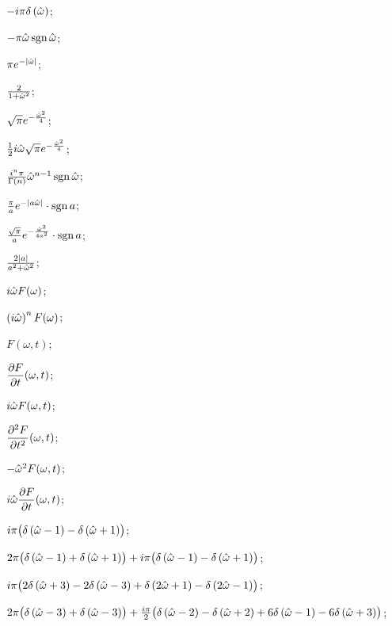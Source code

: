 	\begin{enumsols}

		\item \( - i \pi \delta\left( \hat{\omega} \right) \); \sfill %
		\item \( - \pi \hat{\omega} \operatorname{sgn}{\hat{\omega}} \); \sfill %
		\item \( \pi e^{-\left\vert \hat{\omega} \right\vert} \); \sfill %
		\item \( \frac{2}{1 + \hat{\omega}^2} \); \sfill %
		\item \( \sqrt{\pi} e^{-\frac{\hat{\omega}^2}{4}} \); \sfill %
		\item \( \frac{1}{2} i \hat{\omega} \sqrt{\pi} e^{-\frac{\hat{\omega}^2}{4}} \); \sfill %

		\item \( \frac{i^{n} \pi}{\Gamma(n)} \hat{\omega}^{n-1} \operatorname{sgn}{\hat{\omega}} \); \sfill %
		\item \( \frac{\pi}{a} e^{-\left\vert a\hat{\omega} \right\vert} \cdot \operatorname{sgn}{a} \); \sfill %
		\item \( \frac{\sqrt{\pi}}{a} e^{-\frac{\hat{\omega}^2}{4a^2}} \cdot \operatorname{sgn}{a} \); \sfill %
		\item \( \frac{2 \left\vert a \right\vert}{a^2 + \hat{\omega}^2} \); \sfill %
		\item \( i \hat{\omega} F(\omega) \); \sfill %
		\item \( \left( i \hat{\omega} \right)^{n} F(\omega) \); \sfill %

		\item \( F(\omega, t) \); \sfill %
		\item \( \dfrac{\partial F}{\partial t}(\omega, t) \); \sfill %
		\item \( i \hat{\omega} F(\omega, t) \); \sfill %
		\item \( \dfrac{\partial^{2} F}{\partial t^{2}}(\omega, t) \); \sfill %
		\item \( -\hat{\omega}^2 F(\omega, t) \); \sfill %
		\item \( i \hat{\omega} \dfrac{\partial F}{\partial t}(\omega, t) \); \sfill %

		\item \( i \pi \bigl(  \delta\left( \hat{\omega} - 1 \right) - \delta\left( \hat{\omega}+1 \right)  \bigr) \); \sfill %
		\item \( 2\pi \bigl(  \delta\left( \hat{\omega} - 1 \right) + \delta\left( \hat{\omega}+1 \right)  \bigr) + i \pi \bigl(  \delta\left( \hat{\omega} - 1 \right) - \delta\left( \hat{\omega}+1 \right) \bigr) \); \sfill %
		\item \( i \pi \bigl(  2 \delta\left( \hat{\omega} + 3 \right) - 2 \delta\left( \hat{\omega} - 3 \right) + \delta\left( 2\hat{\omega} + 1 \right) - \delta\left( 2\hat{\omega} - 1 \right)  \bigr) \); \sfill %
		\item \( 2\pi \bigl( \delta\left( \hat{\omega} - 3 \right) + \delta\left( \hat{\omega} - 3 \right) \bigr) + \frac{i \pi}{2} \bigl( \delta\left( \hat{\omega} - 2 \right) - \delta\left( \hat{\omega} + 2 \right) + 6 \delta\left( \hat{\omega} - 1 \right) - 6 \delta\left( \hat{\omega} + 3 \right) \bigr) \); \sfill %


\end{enumsols}

